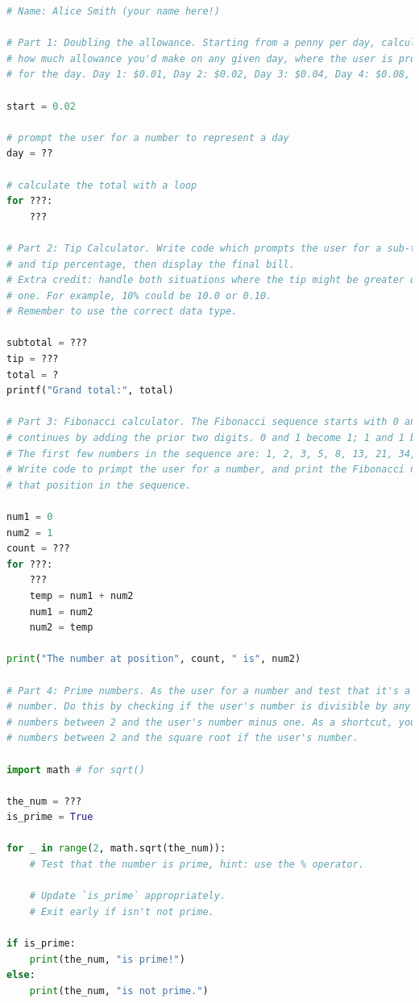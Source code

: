 \documentclass[letter,10pt]{article}
\begin{document}
    \begin{lstlisting}[language=python]
# Name: Alice Smith (your name here!)

# Part 1: Doubling the allowance. Starting from a penny per day, calculate
# how much allowance you'd make on any given day, where the user is prompted
# for the day. Day 1: $0.01, Day 2: $0.02, Day 3: $0.04, Day 4: $0.08, etc.

start = 0.02

# prompt the user for a number to represent a day
day = ??

# calculate the total with a loop
for ???:
    ???

# Part 2: Tip Calculator. Write code which prompts the user for a sub-total
# and tip percentage, then display the final bill.
# Extra credit: handle both situations where the tip might be greater or less than
# one. For example, 10% could be 10.0 or 0.10.
# Remember to use the correct data type.

subtotal = ???
tip = ???
total = ?
printf("Grand total:", total)

# Part 3: Fibonacci calculator. The Fibonacci sequence starts with 0 and 1, and
# continues by adding the prior two digits. 0 and 1 become 1; 1 and 1 become 2; etc.
# The first few numbers in the sequence are: 1, 2, 3, 5, 8, 13, 21, 34, 55, 89.
# Write code to primpt the user for a number, and print the Fibonacci number at
# that position in the sequence.

num1 = 0
num2 = 1
count = ???
for ???:
    ???
    temp = num1 + num2
    num1 = num2
    num2 = temp

print("The number at position", count, " is", num2)

# Part 4: Prime numbers. As the user for a number and test that it's a prime
# number. Do this by checking if the user's number is divisible by any of the
# numbers between 2 and the user's number minus one. As a shortcut, you may check
# numbers between 2 and the square root if the user's number.

import math # for sqrt()

the_num = ???
is_prime = True

for _ in range(2, math.sqrt(the_num)):
    # Test that the number is prime, hint: use the % operator.
    
    # Update `is_prime` appropriately.
    # Exit early if isn't not prime.

if is_prime:
    print(the_num, "is prime!")
else:
    print(the_num, "is not prime.")
        
    \end{lstlisting}
    
\end{document}
